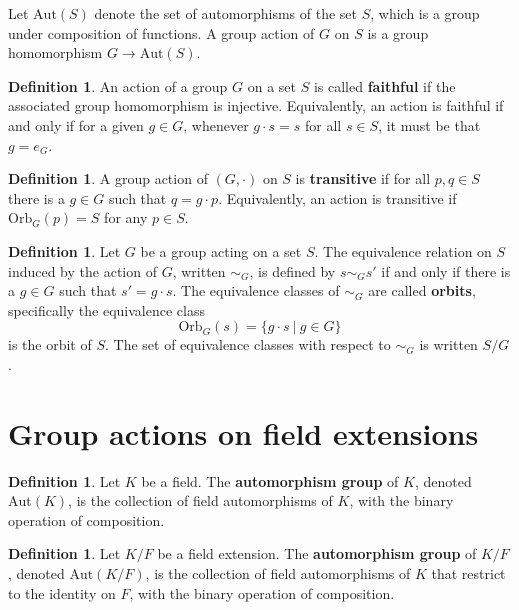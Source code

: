 \documentclass[12pt]{report}
\numberwithin{equation}{section}
\numberwithin{theorem}{chapter}
\theoremstyle{definition}
\newtheorem{definition}[theorem]{Definition}
\newtheorem*{basic properties}{Basic Properties}
\newtheorem*{Important Remark}{Important Remark}
\begin{document}
Let $\mathrm{Aut}(S)$ denote the set of automorphisms of the set $S$, which is a group under composition of functions.
A group action of $G$ on $S$ is a group homomorphism $G \to \mathrm{Aut}(S)$. 


\begin{definition}
 An action of a group $G$ on a set $S$ is called {\bf faithful} if the associated group homomorphism is injective. Equivalently, an action is faithful if and only if for a given $g \in G$, whenever $g \cdot s = s$ for all $s \in S$, it must be that $g = e_G$. 
\end{definition}

\begin{definition}
A group action of $(G, \cdot)$ on $S$ is {\bf transitive} if for all $p,q \in S$ there is a $g \in G$ such that $q=g\cdot p$. Equivalently, an action is transitive if  $\mathrm{Orb}_G(p)=S$ for any $p\in S$.
\end{definition}


\begin{definition}
 Let $G$ be a group acting on a set $S$. The equivalence relation on $S$ induced by the action of $G$, written $\sim_G$, is defined by $s \sim_G s'$ if and only if there is a $g \in G$ such that $s'=g\cdot s$. The equivalence classes of $\sim_G$ are called {\bf orbits}, specifically the equivalence class
 $$\mathrm{Orb}_G(s)=\{g\cdot s \ | \ g\in G\}$$ is the orbit of $S$. The set of equivalence classes with respect to $\sim_G$ is written $S/G$.
 \end{definition}


\section{Group actions on field extensions}

\begin{definition}
Let $K$ be a field. The {\bf automorphism group} of $K$, denoted $\mathrm{Aut}(K)$, is the collection of field automorphisms of $K$, with the binary operation of composition.
\end{definition}

\begin{definition}
 Let $K/F$ be a field extension. The {\bf automorphism group} of $K/F$, denoted $\mathrm{Aut}(K/F)$, is the collection of field automorphisms of $K$ that restrict to the identity on $F$, with the binary operation of composition.
 \end{definition}
 
\end{document}

